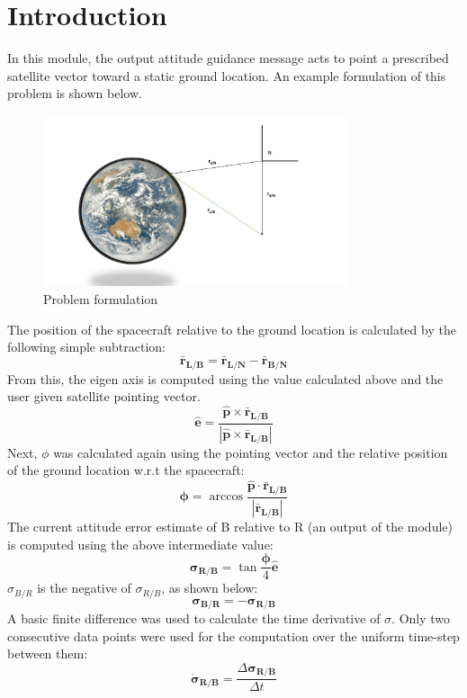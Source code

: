 \documentclass[]{AVSSimReportMemo}
\begin{document}
\section{Introduction}
In this module, the output attitude guidance message acts to point a prescribed satellite vector toward a static ground location. An example formulation of this problem is shown below.\\
\begin{figure}[H]
    \centering
    \includegraphics[width = 0.8\textwidth]{Figures/Problem_formulation.png}
    \caption{Problem formulation}
    \label{fig: formulation}
\end{figure}
The position of the spacecraft relative to the ground location is calculated by the following simple subtraction:
\begin{equation}
    \bm{\bar{r}_{L/B}} = \bm{\bar{r}_{L/N}} - \bm{\bar{r}_{B/N}}
\end{equation}
From this, the eigen axis is computed using the value calculated above and the user given satellite pointing vector.
\begin{equation}
	\label{eq:e}
	\bm{\hat{e}} = \frac{\bm{\hat{p}} \times \bm{\bar{r}_{L/B}}}{|\bm{\hat{p}} \times \bm{\bar{r}_{L/B}}|}
\end{equation}
Next, $\phi$ was calculated again using the pointing vector and the relative position of the ground location w.r.t the spacecraft:
\begin{equation}
	\label{eq:phi}
	\bm \phi = \arccos{\frac{\bm{\hat{p}} \cdot \bm{\bar{r}_{L/B}}}{|\bm{\bar{r}_{L/B}}|}}
\end{equation}
The current attitude error estimate of B relative to R (an output of the module) is computed using the above intermediate value:
\begin{equation}
	\label{eq: sigmaBR}
	\bm{\sigma_{R/B}} = \tan{\frac{\bm \phi}{4}}\bm{\hat{e}}
\end{equation}
$\sigma_{B/R}$ is the negative of $\sigma_{R/B}$, as shown below:
\begin{equation}
    \bm{{\sigma}_{B/R}} = - \bm{{\sigma}_{R/B}}
\end{equation}
A basic finite difference was used to calculate the time derivative of $\sigma$. Only two consecutive data points were used for the computation over the uniform time-step between them:
\begin{equation}
	\label{eq: dsigmaBR}
	\bm{\dot{\sigma}_{R/B}} = \frac{\Delta\bm{\sigma_{R/B}}}{\Delta t}
\end{equation}
\end{document}
